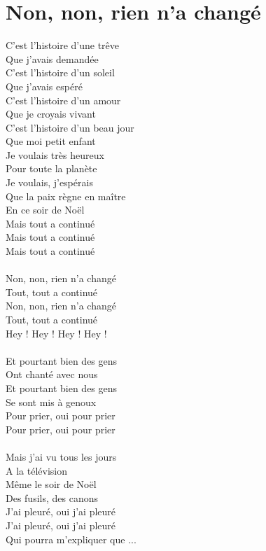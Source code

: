 \section*{Non, non, rien n'a changé}
C'est l'histoire d'une trêve\\
Que j'avais demandée\\
C'est l'histoire d'un soleil\\
Que j'avais espéré\\
C'est l'histoire d'un amour\\
Que je croyais vivant\\
C'est l'histoire d'un beau jour\\
Que moi petit enfant\\
Je voulais très heureux\\
Pour toute la planète\\
Je voulais, j'espérais\\
Que la paix règne en maître\\
En ce soir de Noël\\
Mais tout a continué\\
Mais tout a continué\\
Mais tout a continué\\\\
Non, non, rien n’a changé\\
Tout, tout a continué\\
Non, non, rien n’a changé\\
Tout, tout a continué\\
Hey ! Hey ! Hey ! Hey !\\\\
Et pourtant bien des gens\\
Ont chanté avec nous\\
Et pourtant bien des gens\\
Se sont mis à genoux\\
Pour prier, oui pour prier\\
Pour prier, oui pour prier\\\\
Mais j'ai vu tous les jours\\
A la télévision\\
Même le soir de Noël\\
Des fusils, des canons\\
J'ai pleuré, oui j'ai pleuré\\
J'ai pleuré, oui j'ai pleuré\\
Qui pourra m'expliquer que ...\\\\
